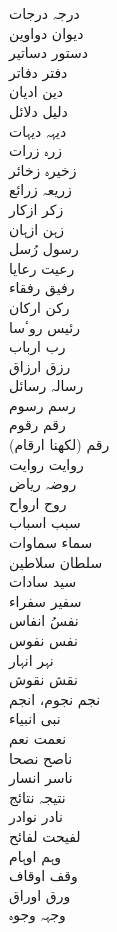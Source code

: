 \documentclass[a4paper]{article}
\begin{document}
\begin{multicols}{3}
\begin{tabbing}
درجہ \> درجات\\
دیوان \> دواوین\\
دستور \> دساتیر\\
دفتر \> دفاتر\\
دین \> ادیان\\
دلیل \> دلائل\\
دیہہ \> دیہات\\
زرہ \> زرات\\
زخیرہ \> زخائر\\
زریعہ \> زرائع\\
زکر \> ازکار\\
زہن \> ازہان\\
رسول \> رُسل\\
رعیت \> رعایا\\
رفیق \> رفقاء\\
رکن \> ارکان\\
رئیس \> روٴسا\\
رب \> ارباب\\
رزق \> ارزاق\\
رسالہ \> رسائل\\
رسم \> رسوم\\
رقم \> رقوم\\
(رقم (لکھنا \> ارقام\\
روایت \> روایت\\
روضہ \> ریاض\\
روح \> ارواح\\
سبب \> اسباب\\
سماء \> سماوات\\
سلطان \> سلاطین\\
سید \> سادات\\
سفیر \> سفراء\\
نفسُ \> انفاس\\
نفس \> نفوس\\
نہر \> انہار\\
نقش \> نقوش\\
نجم \> نجوم، انجم\\
نبی \> انبیاء\\
نعمت \> نعم\\
ناصح \> نصحا\\
ناسر \> انسار\\
نتیجہ \> نتائج\\
نادر \> نوادر\\
لفیحت \> لفائح\\
وہم \> اوہام\\
وقف \> اوقاف\\
ورق \> اوراق\\
وجہہ \> وجوہ\\

\end{tabbing}
\end{multicols}
\end{document}
